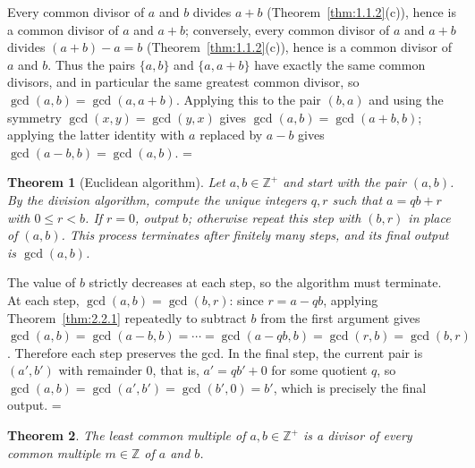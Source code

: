 \documentclass[11pt]{article}
\makeatletter
\theoremstyle{ntstyle}
\newtheorem{theorem}{Theorem}[subsection]
\let\nt@closedisplay\]
\def\nt@guardedclose{\@ifnextchar\par{\nt@closeafterpar}{\@ifnextchar\end{\postdisplaypenalty\@M\nt@closedisplay}{\nt@closedisplay}}}
\def\nt@closeafterpar\par{\@ifnextchar\par{\nt@closeafterpar}{\@ifnextchar\end{\postdisplaypenalty\@M\nt@closedisplay\par}{\nt@closedisplay\par}}}
\renewenvironment{proof}[1][\proofname]{\par
  \pushQED{\qed}\normalfont\topsep\medskipamount\edef\nt@afterproof{\@endparpenalty=\the\@endparpenalty\relax}\@beginparpenalty\@M\@endparpenalty\@M\let\]\nt@guardedclose\trivlist\item[]\textit{#1\@addpunct{.}} \ignorespaces}{\ifvmode\addpenalty\@M\fi\popQED\nt@afterproof\endtrivlist\@endpefalse}
\makeatother
\begin{document}
\begin{proof} Every common divisor of $a$ and $b$ divides
	$a+b$ (Theorem~\ref{thm:1.1.2}(c)), hence is a common divisor of $a$ and $a+b$;
	conversely, every common divisor of $a$ and $a+b$ divides $(a+b) - a =
		b$ (Theorem~\ref{thm:1.1.2}(c)), hence is a common divisor of $a$ and $b$. Thus
	the pairs $\{a, b\}$ and $\{a, a+b\}$ have exactly the same common
	divisors, and in particular the same greatest common divisor, so $\gcd(a, b) =
		\gcd(a, a+b)$. Applying this to
	the pair $(b, a)$ and using the
	symmetry $\gcd(x, y) = \gcd(y, x)$ gives $\gcd(a, b) = \gcd(a+b, b)$; applying the latter identity with $a$ replaced by
	$a-b$ gives $\gcd(a-b, b) = \gcd(a, b)$.
\end{proof}
\begin{theorem}[Euclidean algorithm]\label{thm:2.2.2} Let $a, b \in
		\mathbb{Z}^+$ and start with the pair $(a,b)$. By the division
	algorithm, compute the unique integers $q, r$ such that $a = qb + r$
	with $0 \le r < b$. If $r = 0$, output $b$; otherwise repeat this
	step with $(b, r)$ in place of $(a,b)$. This process terminates after finitely many steps, and its
	final output is $\gcd(a,b)$.
\end{theorem}

\begin{proof} The value of $b$ strictly decreases at each
	step, so the algorithm must terminate. At each step, $\gcd(a, b) = \gcd(b, r)$: since $r = a - qb$, applying
	Theorem~\ref{thm:2.2.1} repeatedly to subtract $b$ from the first argument gives
	$\gcd(a, b) = \gcd(a-b, b) = \cdots = \gcd(a-qb, b) = \gcd(r, b) =
		\gcd(b, r)$. Therefore each step preserves the gcd. In the final step, the current
	pair is $(a', b')$ with remainder $0$, that is, $a' = q b' + 0$ for some
	quotient $q$, so $\gcd(a, b) = \gcd(a', b') = \gcd(b', 0) = b'$,
	which is precisely the final output.
\end{proof}
\begin{theorem}\label{thm:2.2.3} The least common multiple of
	$a,b\in\mathbb{Z}^+$ is a divisor of every common multiple
	$m\in\mathbb{Z}$ of $a$ and $b$.
\end{theorem}
\end{document}
